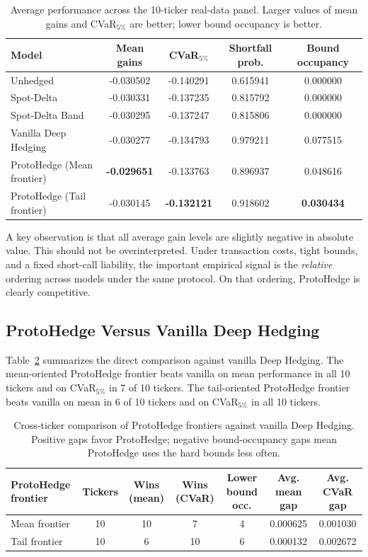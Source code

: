 \documentclass[11pt]{article}
\begin{document}
\begin{table}[H]
\centering
\caption{Average performance across the 10-ticker real-data panel. Larger values of mean gains and CVaR$_{5\%}$ are better; lower bound occupancy is better.}
\label{tab:panel-averages}
\begin{tabular}{lcccc}
\toprule
Model & Mean gains & CVaR$_{5\%}$ & Shortfall prob. & Bound occupancy \\
\midrule
Unhedged & -0.030502 & -0.140291 & 0.615941 & 0.000000 \\
Spot-Delta & -0.030331 & -0.137235 & 0.815792 & 0.000000 \\
Spot-Delta Band & -0.030295 & -0.137247 & 0.815806 & 0.000000 \\
Vanilla Deep Hedging & -0.030277 & -0.134793 & 0.979211 & 0.077515 \\
ProtoHedge (Mean frontier) & \textbf{-0.029651} & -0.133763 & 0.896937 & 0.048616 \\
ProtoHedge (Tail frontier) & -0.030145 & \textbf{-0.132121} & 0.918602 & \textbf{0.030434} \\
\bottomrule
\end{tabular}
\end{table}

A key observation is that all average gain levels are slightly negative in absolute value. This should not be overinterpreted. Under transaction costs, tight bounds, and a fixed short-call liability, the important empirical signal is the \emph{relative} ordering across models under the same protocol. On that ordering, ProtoHedge is clearly competitive.

\subsection{ProtoHedge Versus Vanilla Deep Hedging}
Table~\ref{tab:proto-vs-vanilla} summarizes the direct comparison against vanilla Deep Hedging. The mean-oriented ProtoHedge frontier beats vanilla on mean performance in all 10 tickers and on CVaR$_{5\%}$ in 7 of 10 tickers. The tail-oriented ProtoHedge frontier beats vanilla on mean in 6 of 10 tickers and on CVaR$_{5\%}$ in all 10 tickers.

\begin{table}[H]
\centering
\caption{Cross-ticker comparison of ProtoHedge frontiers against vanilla Deep Hedging. Positive gaps favor ProtoHedge; negative bound-occupancy gaps mean ProtoHedge uses the hard bounds less often.}
\label{tab:proto-vs-vanilla}
\begin{tabular}{lcccccc}
\toprule
ProtoHedge frontier & Tickers & Wins (mean) & Wins (CVaR) & Lower bound occ. & Avg. mean gap & Avg. CVaR gap \\
\midrule
Mean frontier & 10 & 10 & 7 & 4 & 0.000625 & 0.001030 \\
Tail frontier & 10 & 6 & 10 & 6 & 0.000132 & 0.002672 \\
\bottomrule
\end{tabular}
\end{table}
\end{document}
